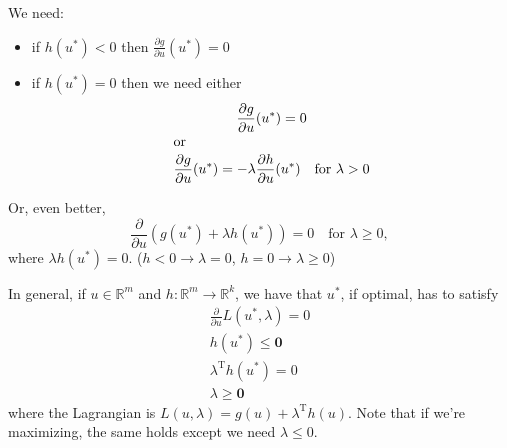 \documentclass[letterpaper,12pt,titlepage]{report}
\newcommand{\trans}{^\text{T}}
\newcommand*\pder[2]{\frac{\partial #1}{\partial #2}}
\newcommand*\R{\mathbb{R}}
\theoremstyle{plain}
\theoremstyle{definition}
\begin{document}
We need:
\begin{itemize}
\item if $h(u^*)<0$ then $\pder{g}{u}(u^*)=0$
\item if $h(u^*)=0$ then we need either
  \begin{gather}
    \pder{g}{u}(u^*) = 0 \\
    \shortintertext{or}
    \pder{g}{u}(u^*) = -\lambda\pder{h}{u}(u^*) \quad \text{for } \lambda>0
  \end{gather}
\end{itemize}
Or, even better,
\[ \pder{}{u} \left( g(u^*) + \lambda h(u^*) \right) = 0 \quad \text{for } \lambda\ge 0, \]
where $\lambda h(u^*)=0$. ($h<0\to\lambda=0$, $h=0\to\lambda\ge0$)

In general, if $u\in\R^m$ and $h:\R^m\to\R^k$, we have that $u^*$, if optimal, has to satisfy
\begin{gather}
  \pder{}{u} L(u^*,\lambda) = 0 \\
  h(u^*) \le \bm 0 \\
  \lambda\trans h(u^*) = 0 \\
  \lambda \ge \bm 0
\end{gather}
where the Lagrangian is $L(u,\lambda) = g(u) + \lambda\trans h(u)$. Note that if we're maximizing, the same holds except we need $\lambda\le 0$.
\end{document}
